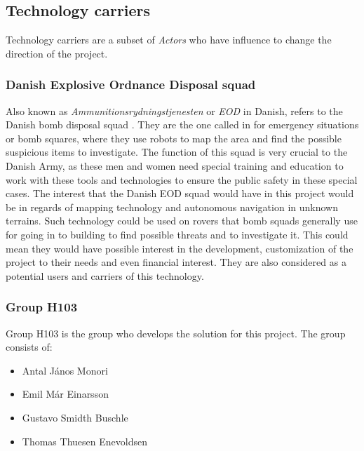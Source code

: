 \subsection{Technology carriers}
Technology carriers are a subset of \textit{Actors} who have influence to change the direction of the project.

\subsubsection{Danish Explosive Ordnance Disposal squad} 
Also known as \textit{Ammunitionsrydningstjenesten} or \textit{EOD} in Danish, refers to the Danish bomb disposal squad \cite{EOD}. They are the one called in for emergency situations or bomb squares, where they use robots to map the area and find the possible suspicious items to investigate. The function of this squad is very crucial to the Danish Army, as these men and women need special training and education to work with these tools and technologies to ensure the public safety in these special cases. The interest that the Danish EOD squad would have in this project would be in regards of mapping technology and autonomous navigation in unknown terrains. Such technology could be used on rovers that bomb squads generally use for going in to building to find possible threats and to investigate it. This could mean they would have possible interest in the development, customization of the project to their needs and even financial interest. They are also considered as a potential users and carriers of this technology.

\subsubsection{Group H103}	
Group H103 is the group who develops the solution for this project. The group consists of:
\begin{itemize}
	\item Antal János Monori
	\item Emil Már Einarsson
	\item Gustavo Smidth Buschle
	\item Thomas Thuesen Enevoldsen
\end{itemize}

